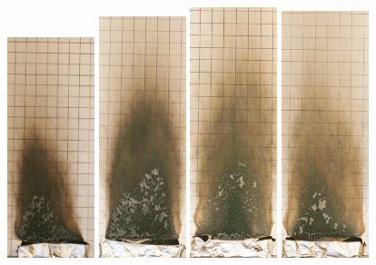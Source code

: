 \documentclass[twoside]{uocthesis}
\begin{document}
{\begin{figure}[p]
	\includegraphics[width=1.0in]{../Figures/GBPUF1_IMG_9332}
	\includegraphics[width=1.0in]{../Figures/GBPUF2_IMG_9347}
	\includegraphics[width=1.0in]{../Figures/GBPUF3_IMG_9362}
	\includegraphics[width=1.0in]{../Figures/GBPUF4_IMG_9376}

\end{figure}}
\end{document}
